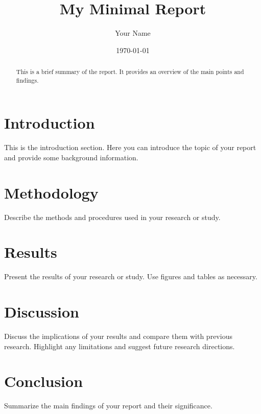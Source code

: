 \documentclass[a4paper, 12pt]{report}
\title{My Minimal Report}
\author{Your Name}
\date{\today}
\begin{document}
\maketitle

\begin{abstract}
This is a brief summary of the report. It provides an overview of the main points and findings.
\end{abstract}

\chapter{Introduction}
This is the introduction section. Here you can introduce the topic of your report and provide some background information.

\chapter{Methodology}
Describe the methods and procedures used in your research or study.

\chapter{Results}
Present the results of your research or study. Use figures and tables as necessary.

\chapter{Discussion}
Discuss the implications of your results and compare them with previous research. Highlight any limitations and suggest future research directions.

\chapter{Conclusion}
Summarize the main findings of your report and their significance.

\printbibliography
\end{document}
